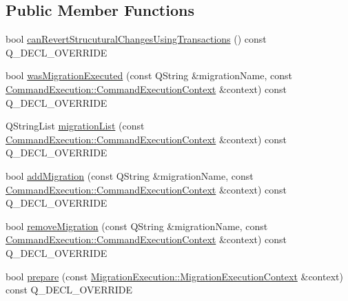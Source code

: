 \subsection*{Public Member Functions}
\begin{DoxyCompactItemize}
\item 
bool \hyperlink{class_q_sql_migrator_1_1_migration_tracker_1_1_base_migration_table_service_aea5fa9e4804a436221180560efeab253}{can\+Revert\+Strucutural\+Changes\+Using\+Transactions} () const Q\+\_\+\+D\+E\+C\+L\+\_\+\+O\+V\+E\+R\+R\+I\+DE
\item 
bool \hyperlink{class_q_sql_migrator_1_1_migration_tracker_1_1_base_migration_table_service_afaa1f00b646de9db114a82597a40f9ea}{was\+Migration\+Executed} (const Q\+String \&migration\+Name, const \hyperlink{class_q_sql_migrator_1_1_command_execution_1_1_command_execution_context}{Command\+Execution\+::\+Command\+Execution\+Context} \&context) const Q\+\_\+\+D\+E\+C\+L\+\_\+\+O\+V\+E\+R\+R\+I\+DE
\item 
Q\+String\+List \hyperlink{class_q_sql_migrator_1_1_migration_tracker_1_1_base_migration_table_service_a1105240b456db9f85c2fc2866582a292}{migration\+List} (const \hyperlink{class_q_sql_migrator_1_1_command_execution_1_1_command_execution_context}{Command\+Execution\+::\+Command\+Execution\+Context} \&context) const Q\+\_\+\+D\+E\+C\+L\+\_\+\+O\+V\+E\+R\+R\+I\+DE
\item 
bool \hyperlink{class_q_sql_migrator_1_1_migration_tracker_1_1_base_migration_table_service_a0acf906f43678d623984e334fe43a11a}{add\+Migration} (const Q\+String \&migration\+Name, const \hyperlink{class_q_sql_migrator_1_1_command_execution_1_1_command_execution_context}{Command\+Execution\+::\+Command\+Execution\+Context} \&context) const Q\+\_\+\+D\+E\+C\+L\+\_\+\+O\+V\+E\+R\+R\+I\+DE
\item 
bool \hyperlink{class_q_sql_migrator_1_1_migration_tracker_1_1_base_migration_table_service_a2b0bf914a7672e5540b7b003cd378aaf}{remove\+Migration} (const Q\+String \&migration\+Name, const \hyperlink{class_q_sql_migrator_1_1_command_execution_1_1_command_execution_context}{Command\+Execution\+::\+Command\+Execution\+Context} \&context) const Q\+\_\+\+D\+E\+C\+L\+\_\+\+O\+V\+E\+R\+R\+I\+DE
\item 
bool \hyperlink{class_q_sql_migrator_1_1_migration_tracker_1_1_base_migration_table_service_a76bec328f72c8fc91002cc285731332c}{prepare} (const \hyperlink{class_q_sql_migrator_1_1_migration_execution_1_1_migration_execution_context}{Migration\+Execution\+::\+Migration\+Execution\+Context} \&context) const Q\+\_\+\+D\+E\+C\+L\+\_\+\+O\+V\+E\+R\+R\+I\+DE
\end{DoxyCompactItemize}


